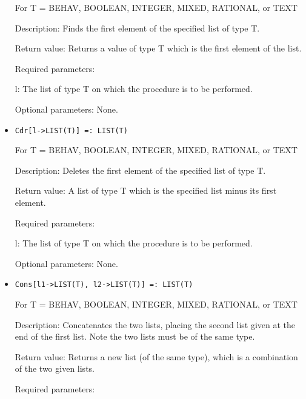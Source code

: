 \begin{itemize}
For T = BEHAV, BOOLEAN, INTEGER, MIXED, RATIONAL, or TEXT

\bd
\item
[Description:] Finds the first element of the specified list of type
T.
\item
[Return value:] Returns a value of type T which is the first element
of the list.
\item 
[Required parameters:]\hfil\null
	
\bd
\item
[l:] The list of type T on which the procedure is to be performed.
\ed

\item
[Optional parameters:] None.
\ed

\item

\protect \large \begin{verbatim}
Cdr[l->LIST(T)] =: LIST(T)
\end{verbatim}\normalsize

For T = BEHAV, BOOLEAN, INTEGER, MIXED, RATIONAL, or TEXT

\bd
\item
[Description:] Deletes the first element of the specified list of type
T.
\item 
[Return value:] A list of type T which is the specified list minus its
first element.
\item   
[Required parameters:]\hfil\null

\bd
\item
[l:] The list of type T on which the procedure is to be performed.
\ed
\item
[Optional parameters:] None.
\ed

\item

\protect \large \begin{verbatim}
Cons[l1->LIST(T), l2->LIST(T)] =: LIST(T)
\end{verbatim}\normalsize

For T = BEHAV, BOOLEAN, INTEGER, MIXED, RATIONAL, or TEXT

\bd
\item
[Description:] Concatenates the two lists, placing the second list
given at the end of the first list.  Note the two lists must be of the
same type.
\item 
[Return value:] Returns a new list (of the same type), which is a
combination of the two given lists.
\item
[Required parameters:]\hfil\null


\end{itemize}
